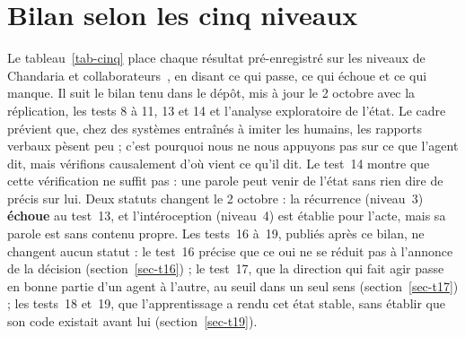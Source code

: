 \documentclass[11pt,a4paper]{article}
\begin{document}
\section{Bilan selon les cinq niveaux}
\label{sec-cinq}

Le tableau~\ref{tab-cinq} place chaque résultat pré-enregistré sur les niveaux de
Chandaria et collaborateurs~\cite{chandaria2026}, en disant ce qui passe, ce qui
échoue et ce qui manque. Il suit le bilan tenu dans le dépôt, mis à jour le
2 octobre avec la réplication, les tests 8 à 11, 13 et 14 et l'analyse exploratoire
de l'état. Le cadre prévient que, chez des systèmes
entraînés à imiter les humains, les rapports verbaux pèsent peu ; c'est pourquoi nous
ne nous appuyons pas sur ce que l'agent dit, mais vérifions causalement d'où vient ce
qu'il dit. Le test~14 montre que cette vérification ne suffit pas : une parole peut
venir de l'état sans rien dire de précis sur lui. Deux statuts changent le 2 octobre :
la récurrence (niveau~3) \textbf{échoue} au test~13, et l'intéroception (niveau~4)
est établie pour l'acte, mais sa parole est sans contenu propre. Les tests~16 à~19,
publiés après ce bilan, ne changent aucun statut : le test~16 précise que ce
\og oui \fg{} ne se réduit pas à l'annonce de la décision (section~\ref{sec-t16}) ; le
test~17, que la direction qui fait agir passe en bonne partie d'un agent à l'autre, au
seuil dans un seul sens (section~\ref{sec-t17}) ; les tests~18 et~19, que l'apprentissage a
rendu cet état stable, sans établir que son code existait avant lui (section~\ref{sec-t19}).
\end{document}
